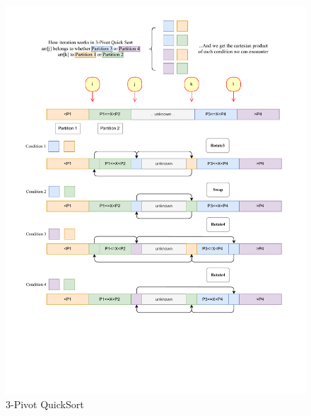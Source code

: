\documentclass[a4paper,oneside,12pt]{book}
\begin{document}
\begin{figure}[H]
    \hypertarget{fig:3pivot}{}
    \caption{3-Pivot QuickSort}
    \centering
    \hspace*{-0.25\textwidth}
    \includegraphics[width=1.5\textwidth]{3pivot.drawio.pdf}
\end{figure}
\end{document}
